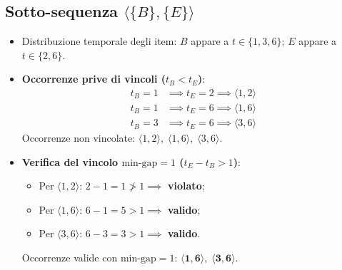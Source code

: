 \FloatBarrier
\subsection[Sotto-sequenza $\langle \{B\}, \{E\} \rangle$]{Sotto-sequenza \texorpdfstring{$\langle \{B\}, \{E\} \rangle$}{<\{B\}, \{E\}>}}
\begin{itemize}
    \item Distribuzione temporale degli item: $B$ appare a $t \in \{1, 3, 6\}$; $E$ appare a $t \in \{2, 6\}$.
    \item \textbf{Occorrenze prive di vincoli ($t_B < t_E$)}:
    \begin{align}
    t_B = 1 &\implies t_E = 2 \implies \langle 1, 2 \rangle \nonumber \\
    t_B = 1 &\implies t_E = 6 \implies \langle 1, 6 \rangle \nonumber \\
    t_B = 3 &\implies t_E = 6 \implies \langle 3, 6 \rangle
    \end{align}
    Occorrenze non vincolate: $\langle 1, 2 \rangle, \; \langle 1, 6 \rangle, \; \langle 3, 6 \rangle$.
    \item \textbf{Verifica del vincolo $\text{min-gap} = 1$ ($t_E - t_B > 1$)}:
    \begin{itemize}
        \item Per $\langle 1, 2 \rangle$: $2 - 1 = 1 \ngtr 1 \implies$ \textbf{violato};
        \item Per $\langle 1, 6 \rangle$: $6 - 1 = 5 > 1 \implies$ \textbf{valido};
        \item Per $\langle 3, 6 \rangle$: $6 - 3 = 3 > 1 \implies$ \textbf{valido}.
    \end{itemize}
    Occorrenze valide con $\text{min-gap} = 1$: $\mathbf{\langle 1, 6 \rangle, \; \langle 3, 6 \rangle}$.
\end{itemize}

\FloatBarrier
